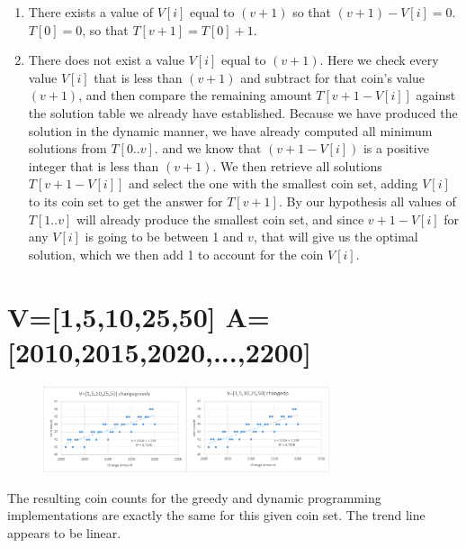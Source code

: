 \documentclass[letWterpaper,10pt,titlepage]{article}
\begin{document}
\begin{enumerate}
\item There exists a value of $V[i]$ equal to $(v+1)$ so that $(v+1)-V[i]=0$. $T[0] = 0$, so that $T[v+1]=T[0]+1$.

\item There does not exist a value $V[i]$ equal to $(v+1)$. Here we check every value $V[i]$ that is less than $(v+1)$ and subtract for that coin's value $(v+1)$, and then compare the remaining amount $T[v+1-V[i]]$ against the solution table we already have established. Because we have produced the solution in the dynamic manner, we have already computed all minimum solutions from $T[0..v]$. and we know that $(v+1-V[i])$ is a positive integer that is less than $(v+1)$. We then retrieve all solutions $T[v+1-V[i]]$ and select the one with the smallest coin set, adding $V[i]$ to its coin set to get the answer for $T[v+1]$. By our hypothesis all values of $T[1..v]$ will already produce the smallest coin set, and since $v+1-V[i]$ for any $V[i]$ is going to be between 1 and $v$, that will give us the optimal solution, which we then add 1 to account for the coin $V[i]$.
\end{enumerate}

\section{V=[1,5,10,25,50] A=[2010,2015,2020,...,2200]}
\begin{figure}[!ht]
    \centering
    \includegraphics[width=0.75\textwidth]{./p4.eps}
\end{figure}
The resulting coin counts for the greedy and dynamic programming implementations are exactly the same for this given coin set. The trend line appears to be linear.
\end{document}
